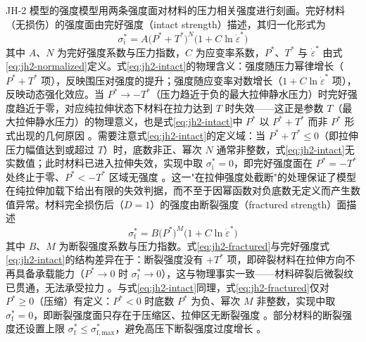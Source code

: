 JH-2 模型的强度模型用两条强度面对材料的压力相关强度进行刻画。完好材料（无损伤）的强度面由完好强度（intact strength）描述，其归一化形式为
\begin{equation}
  \sigma^{*}_{\mathrm{i}}
  =A\bigl(P^{*}+T^{*}\bigr)^{N}\bigl(1+C\ln\dot{\varepsilon}^{*}\bigr)
  \label{eq:jh2-intact}
\end{equation}
其中 $A$、$N$ 为完好强度系数与压力指数，$C$ 为应变率系数，$P^{*}$、$T^{*}$ 与 $\dot{\varepsilon}^{*}$ 由式\eqref{eq:jh2-normalized}定义。式\eqref{eq:jh2-intact}的物理含义：强度随压力幂律增长（$P^{*}+T^{*}$ 项），反映围压对强度的提升；强度随应变率对数增长（$1+C\ln\dot{\varepsilon}^{*}$ 项），反映动态强化效应。当 $P^{*}\to-T^{*}$（压力趋近于负的最大拉伸静水压力）时完好强度趋近于零，对应纯拉伸状态下材料在拉力达到 $T$ 时失效——这正是参数 $T$（最大拉伸静水压力）的物理意义，也是式\eqref{eq:jh2-intact}中 $P^{*}$ 以 $P^{*}+T^{*}$ 而非 $P^{*}$ 形式出现的几何原因 \cite{JohnsonHolmquist1994}。需要注意式\eqref{eq:jh2-intact}的定义域：当 $P^{*}+T^{*}\le0$（即拉伸压力幅值达到或超过 $T$）时，底数非正、幂次 $N$ 通常非整数，式\eqref{eq:jh2-intact}无实数值；此时材料已进入拉伸失效，实现中取 $\sigma^{*}_{\mathrm{i}}=0$，即完好强度面在 $P^{*}=-T^{*}$ 处终止于零、$P^{*}<-T^{*}$ 区域无强度 \cite{JohnsonHolmquist1994}。这一"在拉伸强度处截断"的处理保证了模型在纯拉伸加载下给出有限的失效判据，而不至于因幂函数对负底数无定义而产生数值异常。材料完全损伤后（$D=1$）的强度由断裂强度（fractured strength）面描述
\begin{equation}
  \sigma^{*}_{\mathrm{f}}
  =B\bigl(P^{*}\bigr)^{M}\bigl(1+C\ln\dot{\varepsilon}^{*}\bigr)
  \label{eq:jh2-fractured}
\end{equation}
其中 $B$、$M$ 为断裂强度系数与压力指数。式\eqref{eq:jh2-fractured}与完好强度式\eqref{eq:jh2-intact}的结构差异在于：断裂强度没有 $+T^{*}$ 项，即碎裂材料在拉伸方向不再具备承载能力（$P^{*}\to0$ 时 $\sigma^{*}_{\mathrm{f}}\to0$），这与物理事实一致——材料碎裂后微裂纹已贯通，无法承受拉力 \cite{JohnsonHolmquist1994,JohnsonHolmquist1999}。与式\eqref{eq:jh2-intact}同理，式\eqref{eq:jh2-fractured}仅对 $P^{*}\ge0$（压缩）有定义：$P^{*}<0$ 时底数 $P^{*}$ 为负、幂次 $M$ 非整数，实现中取 $\sigma^{*}_{\mathrm{f}}=0$，即断裂强度面只存在于压缩区、拉伸区无断裂强度 \cite{JohnsonHolmquist1994}。部分材料的断裂强度还设置上限 $\sigma^{*}_{\mathrm{f}}\le\sigma^{*}_{\mathrm{f,max}}$，避免高压下断裂强度过度增长 \cite{HolmquistTempletonBishnoi2001}。

